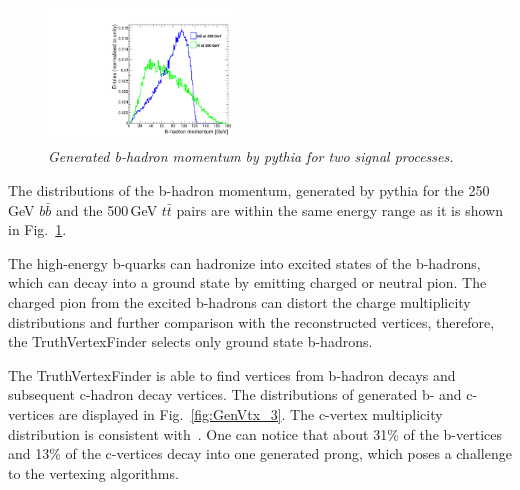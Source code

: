 \begin{figure}[h]
{\centering
    \includegraphics[width=0.45\textwidth]{ILD/plots/gen-hadron-momentum.pdf}
    \caption{\sl Generated b-hadron momentum by {\sc pythia} for two signal processes.}
    \label{fig:GenHadronMomentum_3}
  }
\end{figure}
The distributions of the b-hadron momentum, generated by {\sc pythia} for the 250\,GeV $b\bar{b}$ and the 500\,GeV $t\bar{t}$ pairs are within the same energy range as it is shown in Fig.~\ref{fig:GenHadronMomentum_3}.

The high-energy b-quarks can hadronize into excited states of the b-hadrons, which can decay into a ground state by emitting charged or neutral pion. 
The charged pion from the excited b-hadrons can distort the charge multiplicity distributions and further comparison with the reconstructed vertices, therefore, the TruthVertexFinder selects only ground state b-hadrons. 

The TruthVertexFinder is able to find vertices from b-hadron decays and subsequent c-hadron decay vertices. The distributions of generated b- and c-vertices are displayed in Fig.~\ref{fig:GenVtx_3}. The c-vertex multiplicity distribution is consistent with~\cite{bib:PDG}. One can notice that about 31\% of the b-vertices and 13\% of the c-vertices decay into one generated prong, which poses a challenge to the vertexing algorithms. 

